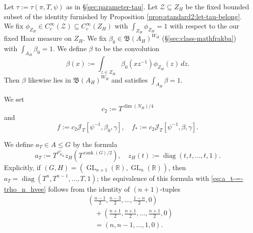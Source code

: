 \documentclass[reqno]{amsart}
\DeclareMathOperator{\GL}{GL}
\DeclareMathOperator{\diag}{diag}
\DeclareMathOperator{\rank}{rank}
\theoremstyle{plain} \newtheorem{theorem} {Theorem}
\theoremstyle{definition} \newtheorem{definition} [theorem] {Definition}
\theoremstyle{itplain} %
\numberwithin{equation}{section}
\numberwithin{theorem}{section}
\renewcommand{\leq}{\leqslant}
\begin{document}
Let $\tau := \tau(\pi,T,\psi)$ as in \S\ref{sec:parameter-tau}.  Let $\mathcal{Z} \subseteq Z_H$ be the fixed bounded subset of the identity furnished by Proposition \ref{prop:standard2:let-tau-belong}.  We fix $\phi_{Z_H} \in C_c^\infty(\mathcal{Z}) \subseteq C_c^\infty(Z_H)$ with $\int_{Z_H} \phi_{Z_H} = 1$ with respect to the our fixed Haar measure on $Z_H$.  We fix $\beta_0 \in \mathfrak{B}(A_H)^{W_H}$ (\S\ref{sec:class-mathfrakba}) with $\int_{A_H} \beta_0 = 1$.  We define $\beta$ to be the convolution
\begin{equation}\label{eq:hx-:=-int}
  \beta (x) := \int _{z \in Z_H} \beta_0(x z^{-1}) \phi_{Z_H}(z) \, d z.
\end{equation}
Then $\beta$ likewise lies in $\mathfrak{B}(A_H)^{W_H}$ and satisfies $\int_{A_H} \beta = 1$.

We set
\begin{equation*}
c_2 := T^{\dim(N_H)/4}
\end{equation*}
and
\begin{equation*}
  f := c_2 \mathcal{J}_T[\psi^{-1},\beta_0,\gamma],
  \quad 
  f_{\ast} := c_2 \mathcal{J}_T[\psi^{-1},\beta,\gamma].
\end{equation*}


We define $a_T \in A \leq G$ by the formula
\begin{equation}\label{eq:a_t-=-trho_n_hvee}
  a_T := T^{\rho_{N_H}^\vee} z_H(T^{\rank(G)/2}),
  \quad
  z_H(t) := \diag(t,t,\dotsc,t,1).
\end{equation}
Explicitly, if $(G,H) = (\GL_{n+1}(\mathbb{R}), \GL_n(\mathbb{R}))$, then
$a_T = \diag(T^{n}, T^{n-1}, \dotsc, T, 1)$; the equivalence of this formula with \eqref{eq:a_t-=-trho_n_hvee} follows from the identity of $(n+1)$-tuples
\begin{align*}
  &\left( \frac{n-1}{2},
    \frac{n-3}{2},
    \dotsc,
    \frac{1-n}{2}, 0
  \right) \\
  &\quad +
  \left( \frac{n + 1}{2}, \frac{n + 1}{2}, \dotsc,
    \frac{n + 1}{2}, 0\right)
    \\
  &\quad =
  \left( n, n - 1, \dotsc, 1, 0 \right).
\end{align*}
\end{document}
